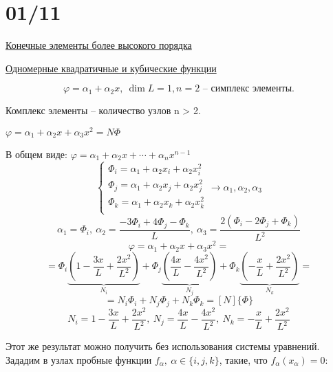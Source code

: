 \documentclass{bmstu}
\begin{document}
\section*{01/11}
\begin{center}
\underline{Конечные элементы более высокого порядка}

\underline{Одномерные квадратичные и кубические функции}
\end{center}
\[
\varphi = \alpha_1 + \alpha_2x, \ \dim L = 1, n = 2 \text{ -- симплекс элементы.}
\]

Комплекс элементы -- количество узлов n > 2.  

\begin{center}
\end{center}

$\varphi = \alpha_1 + \alpha_2x + \alpha_3x^2 = N \Phi$

В общем виде: $\varphi = \alpha_1 + \alpha_2x + \cdots + \alpha_nx^{n-1}$
\[
\begin{cases}
\Phi_i = \alpha_1 + \alpha_2x_i + \alpha_2x^{2}_i \\
\Phi_j = \alpha_1 + \alpha_2x_j + \alpha_2x^{2}_j \\
\Phi_k = \alpha_1 + \alpha_2x_k + \alpha_2x^{2}_k \\
\end{cases}
\rightarrow \alpha_1, \alpha_2, \alpha_3
\]
\[
\alpha_1 = \Phi_i, \ \alpha_2 = \frac{-3\Phi_i + 4\Phi_j -\Phi_k}{L}, \ \alpha_3 = \frac{2(\Phi_i-2\Phi_j+\Phi_k)}{L^2}
\]
\[
\varphi = \alpha_1 + \alpha_2x + \alpha_3x^2 = 
\]
\[
 = \Phi_i   \underbrace{\left(1 - \frac{3x}{L} + \frac{2x^2}{L^2} \right) }_{N_i}   + \Phi_j \underbrace{\left(\frac{4x}{L} - \frac{4x^2}{L^2} \right)}_{N_j} + \Phi_k \underbrace{\left(-\frac{x}{L} + \frac{2x^2}{L^2} \right)}_{N_k} = 
\]
\[
 = N_i \Phi_i + N_j \Phi_j + N_k \Phi_k = [N]\{\Phi\}
\]
\[
N_i = 1 - \frac{3x}{L} + \frac{2x^2}{L^2}, \ N_j = \frac{4x}{L} - \frac{4x^2}{L^2}, \ N_k = -\frac{x}{L} + \frac{2x^2}{L^2}
\]

Этот же результат можно получить без использования системы уравнений. Зададим в узлах пробные функции $f_{\alpha},\ \alpha \in \{i, j, k\}$, такие, что $f_{\alpha}(x_{\alpha}) = 0$:
\end{document}
